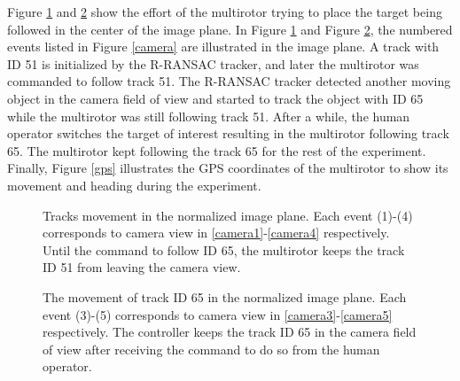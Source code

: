 Figure \ref{image1} and \ref{image2} show the effort of the multirotor trying to place the target being followed in the center of the image plane. In Figure \ref{image1} and Figure \ref{image2}, the numbered events listed in Figure \ref{camera} are illustrated in the image plane. A track with ID 51 is initialized by the R-RANSAC tracker, and later the multirotor was commanded to follow track 51. The R-RANSAC tracker detected another moving object in the camera field of view and started to track the object with ID 65 while the multirotor was still following track 51. After a while, the human operator switches the target of interest resulting in the multirotor following track 65. The multirotor kept following the track 65 for the rest of the experiment. Finally, Figure \ref{gps} illustrates the GPS coordinates of the multirotor to show its movement and heading during the experiment. 

\begin{figure}[htbp]
	\centering
	\caption{Tracks movement in the normalized image plane. Each event (1)-(4) corresponds to camera view in \ref{camera1}-\ref{camera4} respectively. Until the command to follow ID 65, the multirotor keeps the track ID 51 from leaving the camera view.}
	\label{image1}
\end{figure}

\begin{figure}[htbp]
	\centering
	\caption{The movement of track ID 65 in the normalized image plane. Each event (3)-(5) corresponds to camera view in \ref{camera3}-\ref{camera5} respectively. The controller keeps the track ID 65 in the camera field of view after receiving the command to do so from the human operator.}
	\label{image2}
\end{figure}

